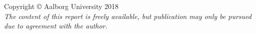 \thispagestyle{empty}

  

{\small
\strut\vfill %
\noindent Copyright \copyright{} Aalborg University 2018\\

\noindent\textit{The content of this report is freely available, but publication may only be pursued due to agreement with the author.}\par
\vspace{0.2cm}
\noindent 
}
\clearpage
